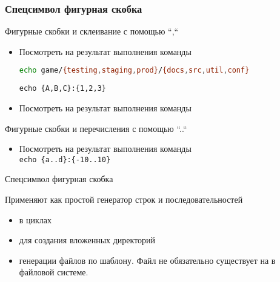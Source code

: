 \begin{frame}[fragile]
	\frametitle{Спецсимвол фигурная скобка}

	\begin{block}{Фигурные скобки и склеивание с помощью ``,``}
		\begin{itemize}
			\item Посмотреть на результат выполнения команды \\
\begin{lstlisting}[language=bash]
echo game/{testing,staging,prod}/{docs,src,util,conf}
\end{lstlisting}
				{\tt echo \{A,B,C\}:\{1,2,3\}}
				\pause
			\item Посмотреть на результат выполнения команды 
		\end{itemize}
	\end{block}


	\pause

	\begin{block}{Фигурные скобки и перечисления с помощью ``..``}
		\begin{itemize}
			\item Посмотреть на результат выполнения команды \\
				{\tt echo \{a..d\}:\{-10..10\}}
		\end{itemize}
	\end{block}

\end{frame}

\begin{frame}{Спецсимвол фигурная скобка}

Применяют как простой генератор строк и последовательностей
\begin{itemize}
    \item в циклах 
    \item для создания вложенных директорий 
    \item генерации файлов по шаблону. Файл не обязательно существует на в файловой системе.
\end{itemize}
\end{frame}
